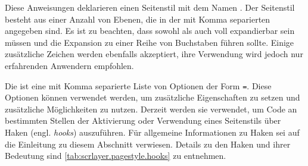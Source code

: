 \begin{Declaration}
\end{Declaration}
%
%
Diese Anweisungen deklarieren einen Seitenstil mit dem Namen
. Der Seitenstil besteht aus einer Anzahl von Ebenen,
die in der mit Komma separierten  angegeben sind. Es ist zu
beachten, dass sowohl  als auch
 voll expandierbar sein müssen und die Expansion zu einer
Reihe von Buchstaben führen sollte. Einige zusätzliche Zeichen werden
ebenfalls akzeptiert, ihre Verwendung wird jedoch nur erfahrenden Anwendern
empfohlen.

Die  ist eine mit Komma separierte Liste von Optionen der
Form \texttt{=}. Diese Optionen können verwendet
werden, um zusätzliche Eigenschaften zu setzen und zusätzliche Möglichkeiten
zu nutzen. Derzeit werden sie verwendet, um \mbox{Code} an bestimmten Stellen
der Aktivierung oder Verwendung eines Seitenstils über Haken
(engl. \emph{hooks}) auszuführen. Für allgemeine Informationen zu Haken sei
auf die Einleitung zu diesem Abschnitt verwiesen. Details zu den Haken und
ihrer Bedeutung sind \autoref{tab:scrlayer.pagestyle.hooks} zu entnehmen.

